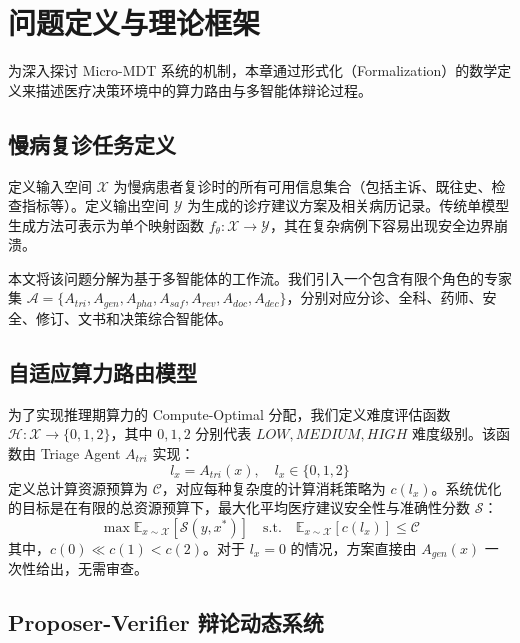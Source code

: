\documentclass[11pt,a4paper]{ctexart}
\begin{document}
\newpage
\section{问题定义与理论框架}

为深入探讨 Micro-MDT 系统的机制，本章通过形式化（Formalization）的数学定义来描述医疗决策环境中的算力路由与多智能体辩论过程。

\subsection{慢病复诊任务定义}

定义输入空间 $\mathcal{X}$ 为慢病患者复诊时的所有可用信息集合（包括主诉、既往史、检查指标等）。定义输出空间 $\mathcal{Y}$ 为生成的诊疗建议方案及相关病历记录。传统单模型生成方法可表示为单个映射函数 $f_{\theta}: \mathcal{X} \rightarrow \mathcal{Y}$，其在复杂病例下容易出现安全边界崩溃。

本文将该问题分解为基于多智能体的工作流。我们引入一个包含有限个角色的专家集 $\mathcal{A} = \{A_{tri}, A_{gen}, A_{pha}, A_{saf}, A_{rev}, A_{doc}, A_{dec}\}$，分别对应分诊、全科、药师、安全、修订、文书和决策综合智能体。

\subsection{自适应算力路由模型}

为了实现推理期算力的 Compute-Optimal 分配，我们定义难度评估函数 $\mathcal{H}: \mathcal{X} \rightarrow \{0, 1, 2\}$，其中 $0, 1, 2$ 分别代表 $LOW, MEDIUM, HIGH$ 难度级别。该函数由 Triage Agent $A_{tri}$ 实现：
\begin{equation}
    l_x = A_{tri}(x), \quad l_x \in \{0, 1, 2\}
\end{equation}
定义总计算资源预算为 $\mathcal{C}$，对应每种复杂度的计算消耗策略为 $c(l_x)$。系统优化的目标是在有限的总资源预算下，最大化平均医疗建议安全性与准确性分数 $\mathcal{S}$：
\begin{equation}
    \max \mathbb{E}_{x \sim \mathcal{X}}[\mathcal{S}(y, x^*)] \quad \text{s.t.} \quad \mathbb{E}_{x \sim \mathcal{X}}[c(l_x)] \leq \mathcal{C}
\end{equation}
其中，$c(0) \ll c(1) < c(2)$。对于 $l_x = 0$ 的情况，方案直接由 $A_{gen}(x)$ 一次性给出，无需审查。

\subsection{Proposer-Verifier 辩论动态系统}
\end{document}
